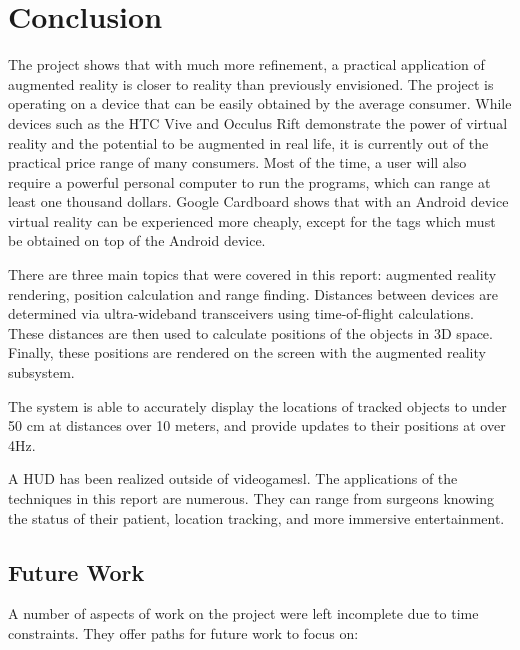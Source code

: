 
\chapter{Conclusion} %

\label{Conclusion} %


The project shows that with much more refinement, a practical application of augmented reality is closer to reality than previously envisioned. The project is operating on a device that can be easily obtained by the average consumer. While devices such as the HTC Vive and Occulus Rift demonstrate the power of virtual reality and the potential to be augmented in real life, it is currently out of the practical price range of many consumers. Most of the time, a user will also require a powerful personal computer to run the programs, which can range at least one thousand dollars. Google Cardboard shows that with an Android device virtual reality can be experienced more cheaply, except for the tags which must be obtained on top of the Android device. 

There are three main topics that were covered in this report: augmented reality rendering, position calculation and range finding. Distances between devices are determined via ultra-wideband transceivers using time-of-flight calculations. These distances are then used to calculate positions of the objects in 3D space. Finally, these positions are rendered on the screen with the augmented reality subsystem.

The system is able to accurately display the locations of tracked objects to under 50 cm at distances over 10 meters, and provide updates to their positions at over 4Hz.

A HUD has been realized outside of videogamesl. The applications of the techniques in this report are numerous. They can range from surgeons knowing the status of their patient, location tracking, and more immersive entertainment. 

\section{Future Work}
A number of aspects of work on the project were left incomplete due to time constraints. They offer paths for future work to focus on:

